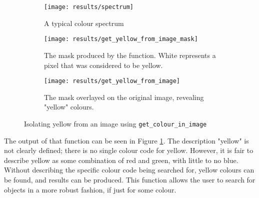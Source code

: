 \documentclass[../main.tex]{subfiles}
\begin{document}
    \begin{figure}[h]
      \centering
      \begin{subfigure}[B]{0.8\textwidth}
        \centering
        \texttt{[image: results/spectrum]}
        \caption{A typical colour spectrum}
      \end{subfigure}

      \begin{subfigure}[B]{0.8\textwidth}
        \centering
        \texttt{[image: results/get\_yellow\_from\_image\_mask]}
        \caption{The mask produced by the function. White represents a pixel that was considered to be yellow.}
      \end{subfigure}

      \begin{subfigure}[B]{0.8\textwidth}
        \centering
        \texttt{[image: results/get\_yellow\_from\_image]}
        \caption{The mask overlayed on the original image, revealing "yellow" colours.}
      \end{subfigure}
      \caption{Isolating yellow from an image using \texttt{get\_colour\_in\_image}}
      \label{findyellow}
    \end{figure}

    The output of that function can be seen in Figure \ref{findyellow}.
    The description "yellow" is not clearly defined; there is no single colour code for yellow.
    However, it is fair to describe yellow as some combination of red and green, with little to no blue.
    Without describing the specific colour code being searched for, yellow colours can be found, and results can be produced.
    This function allows the user to search for objects in a more robust fashion, if just for some colour.
\end{document}
